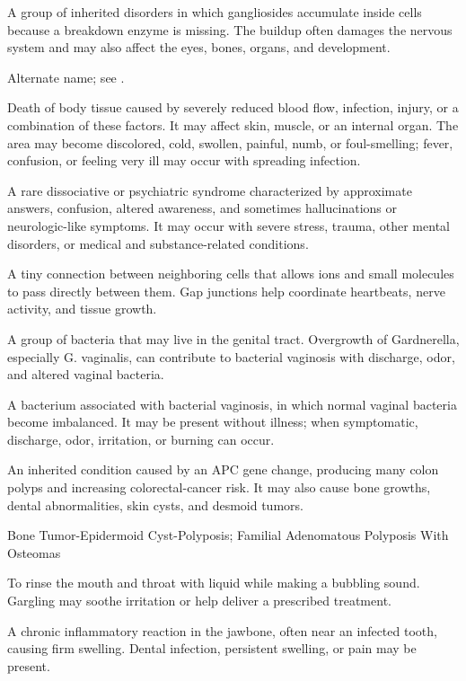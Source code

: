  A group of inherited disorders in which gangliosides accumulate inside cells because a breakdown enzyme is missing. The buildup often damages the nervous system and may also affect the eyes, bones, organs, and development.

 Alternate name; see .

 Death of body tissue caused by severely reduced blood flow, infection, injury, or a combination of these factors. It may affect skin, muscle, or an internal organ. The area may become discolored, cold, swollen, painful, numb, or foul-smelling; fever, confusion, or feeling very ill may occur with spreading infection.

 A rare dissociative or psychiatric syndrome characterized by approximate answers, confusion, altered awareness, and sometimes hallucinations or neurologic-like symptoms. It may occur with severe stress, trauma, other mental disorders, or medical and substance-related conditions.

 A tiny connection between neighboring cells that allows ions and small molecules to pass directly between them. Gap junctions help coordinate heartbeats, nerve activity, and tissue growth.

 A group of bacteria that may live in the genital tract. Overgrowth of Gardnerella, especially G. vaginalis, can contribute to bacterial vaginosis with discharge, odor, and altered vaginal bacteria.

 A bacterium associated with bacterial vaginosis, in which normal vaginal bacteria become imbalanced. It may be present without illness; when symptomatic, discharge, odor, irritation, or burning can occur.

 An inherited condition caused by an APC gene change, producing many colon polyps and increasing colorectal-cancer risk. It may also cause bone growths, dental abnormalities, skin cysts, and desmoid tumors.

\synonyms
Bone Tumor-Epidermoid Cyst-Polyposis; Familial Adenomatous Polyposis With Osteomas

 To rinse the mouth and throat with liquid while making a bubbling sound. Gargling may soothe irritation or help deliver a prescribed treatment.

 A chronic inflammatory reaction in the jawbone, often near an infected tooth, causing firm swelling. Dental infection, persistent swelling, or pain may be present.

